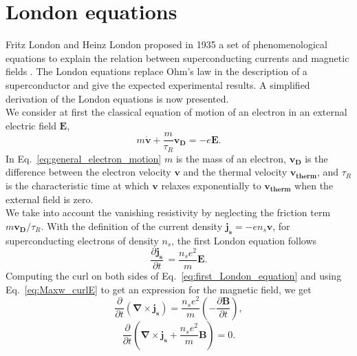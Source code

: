 \documentclass[../main/main.tex]{subfiles}
\begin{document}
\section{London equations}
Fritz London and Heinz London proposed in 1935 a set of phenomenological equations to explain the relation between superconducting currents and magnetic fields \cite{London_equations}. The London equations replace Ohm's law in the description of a superconductor and give the expected experimental results. A simplified derivation of the London equations is now presented.\\
We consider at first the classical equation of motion of an electron in an external electric field $\boldsymbol{E}$,
\begin{equation} \label{eq:general_electron_motion}
    m \boldsymbol{\dot{v}} + \frac{m}{\tau_R} \boldsymbol{v_D} = -e \boldsymbol{E}.
\end{equation}
In Eq.~\eqref{eq:general_electron_motion} $m$ is the mass of an electron, $\boldsymbol{v_D}$ is the difference between the electron velocity $\boldsymbol{v}$ and the thermal velocity $\boldsymbol{v_{\text{therm}}}$, and $\tau_R$ is the characteristic time at which $\boldsymbol{v}$ relaxes exponentially to $\boldsymbol{v_{\text{therm}}}$ when the external field is zero.\\
We take into account the vanishing resistivity by neglecting the friction term $m \boldsymbol{v_D}/\tau_R$. With the definition of the current density $\boldsymbol{j_s}=-e n_s \boldsymbol{v}$, for superconducting electrons of density $n_s$, the first London equation follows
\begin{equation} \label{eq:first_London_equation}
    \frac{\partial \boldsymbol{j_s}}{\partial t}\,  = \frac{n_s e^2}{m} \boldsymbol{E}.
\end{equation}
Computing the curl on both sides of Eq.~\eqref{eq:first_London_equation} and using Eq.~\eqref{eq:Maxw_curlE} to get an expression for the magnetic field, we get
\begin{equation} \nonumber
    \frac{\partial}{\partial t} \left( \boldsymbol{\nabla}  \times \boldsymbol{j_s} \right) = \frac{n_s e^2}{m} \left( -\frac{\partial \boldsymbol{B}}{\partial t} \right),
\end{equation}
\begin{equation} \label{eq:prel_second_London_equation}
     \frac{\partial}{\partial t} \left( \boldsymbol{\nabla}  \times \boldsymbol{j_s} + \frac{n_s e^2}{m} \boldsymbol{B} \right) = 0.
\end{equation}
\end{document}
